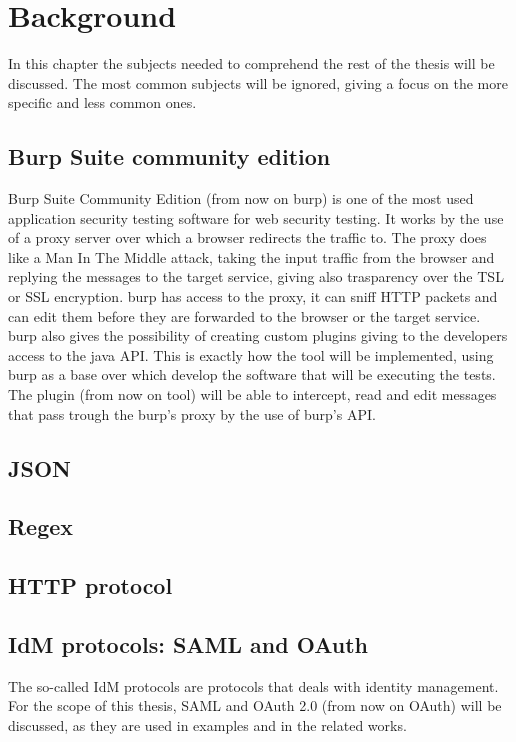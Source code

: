 \printglossary

\chapter{Background}
In this chapter the subjects needed to comprehend the rest of the thesis will be discussed. The most common subjects will be ignored, giving a focus on the more specific and less common ones.

\section{Burp Suite community edition}
Burp Suite Community Edition (from now on \Gls{burp}) is one of the most used application security testing software for web security testing. It works by the use of a proxy server over which a browser redirects the traffic to. The proxy does like a Man In The Middle attack, taking the input traffic from the browser and replying the messages to the target service, giving also trasparency over the TSL or SSL encryption. \Gls{burp} has access to the proxy, it can sniff HTTP packets and can edit them before they are forwarded to the browser or the target service. \Gls{burp} also gives the possibility of creating custom plugins giving to the developers access to the java API. This is exactly how the tool will be implemented, using \Gls{burp} as a base over which develop the software that will be executing the tests. The plugin (from now on tool) will be able to intercept, read and edit messages that pass trough the \Gls{burp}'s proxy by the use of \Gls{burp}'s API.

\section{JSON}


\section{Regex}


\section{HTTP protocol}


\section{IdM protocols: SAML and OAuth}
The so-called IdM protocols are protocols that deals with identity management. For the scope of this thesis, SAML and \Gls{OAuth} 2.0 (from now on \Gls{OAuth}) will be discussed, as they are used in examples and in the related works.

